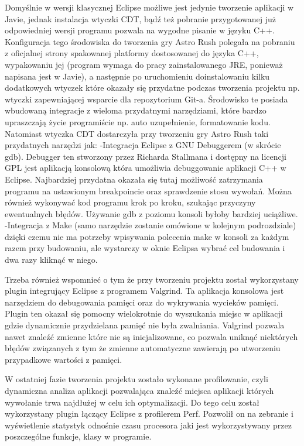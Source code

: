Domyślnie w wersji klasycznej Eclipse możliwe jest jedynie tworzenie aplikacji w Javie, jednak instalacja wtyczki CDT, bądź też pobranie przygotowanej już odpowiedniej wersji programu pozwala na wygodne pisanie w języku C++.
Konfiguracja tego środowiska do tworzenia gry Astro Rush polegała na pobraniu z oficjalnej strony spakowanej platformy dostosowanej do języka C++, wypakowaniu jej (program wymaga do pracy zainstalowanego JRE, ponieważ napisana jest w Javie), a następnie po uruchomieniu doinstalowaniu kilku dodatkowych wtyczek które okazały się przydatne podczas tworzenia projektu np. wtyczki zapewniającej wsparcie dla repozytorium Git-a. Środowisko te posiada wbudowaną integracje z wieloma przydatnymi narzędziami, które bardzo upraszczają życie programiście np. auto uzupełnienie, formatowanie kodu. Natomiast wtyczka CDT dostarczyła przy tworzeniu gry Astro Rush taki przydatnych narzędzi jak:
-Integracja Eclipse z GNU Debuggerem (w skrócie gdb). Debugger ten stworzony przez Richarda Stallmana i dostępny na licencji GPL jest aplikacją konsolową która umożliwia debuggowanie aplikacji C++ w Eclipse. Najbardziej przydatna okazała się tutaj możliwość zatrzymania programu na ustawionym breakpoincie oraz sprawdzenie stosu wywołań. Można również wykonywać kod programu krok po kroku, szukając przyczyny ewentualnych błędów. Używanie gdb z poziomu konsoli byłoby bardziej uciążliwe. 
-Integracja z Make (samo narzędzie zostanie omówione w kolejnym podrozdziale) dzięki czemu nie ma potrzeby wpisywania polecenia make w konsoli za każdym razem przy budowaniu, ale wystarczy w oknie Eclipsa wybrać cel budowania i dwa razy kliknąć w niego.

Trzeba również wspomnieć o tym że przy tworzeniu projektu został wykorzystany plugin integrujący Eclipse z programem Valgrind. 
Ta aplikacja konsolowa jest narzędziem do debugowania pamięci oraz do wykrywania wycieków pamięci. Plugin ten okazał się pomocny wielokrotnie do wyszukania miejsc w aplikacji gdzie dynamicznie przydzielana pamięć nie była zwalniania. Valgrind pozwala nawet znaleźć zmienne które nie są inicjalizowane, co pozwala uniknąć niektórych błędów związanych z tym że zmienne automatyczne zawierają po utworzeniu przypadkowe wartości z pamięci. 

W ostatniej fazie tworzenia projektu zostało wykonane profilowanie, czyli dynamiczna analiza aplikacji pozwalająca znaleźć miejsca aplikacji których wywołanie trwa najdłużej w celu ich optymalizacji. Do tego celu został wykorzystany plugin łączący Eclipse z profilerem Perf. Pozwolił on na zebranie i wyświetlenie statystyk odnośnie czasu procesora jaki jest wykorzystywany przez poszczególne funkcje, klasy w programie.

